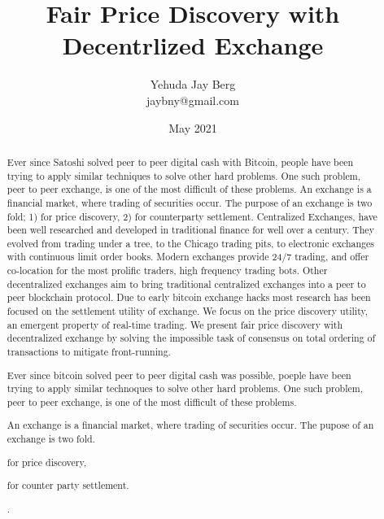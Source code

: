 \documentclass[12pt]{article}
\title{Fair Price Discovery with Decentrlized Exchange}
\author{Yehuda Jay Berg \\jaybny@gmail.com}
\date{May 2021}
\begin{document}
\parindent 0cm
\parskip   6pt
\maketitle




\begin{abstract}
    Ever  since  Satoshi  solved  peer  to  peer  digital  cash  with  Bitcoin,  people have  been  trying  to  apply  similar  techniques  to  solve  other  hard  problems. One such problem, peer to peer exchange, is one of the most difficult of these problems. An exchange is a financial market, where trading of securities occur. The purpose of an exchange is two fold;  1) for price discovery, 2) for counterparty settlement. Centralized Exchanges, have been well researched and developed in traditional finance for well over a century.  They evolved from trading under a tree, to the Chicago trading pits, to electronic exchanges with continuous limit order books. Modern exchanges provide 24/7 trading, and offer co-location for the most prolific traders, high frequency trading bots. Other decentralized exchanges aim to bring traditional centralized exchanges into a peer to peer blockchain protocol. Due to early bitcoin exchange hacks most research has been focused on the settlement utility of exchange. We focus on the price discovery utility, an emergent property of real-time trading. We present fair price discovery with decentralized exchange by solving the impossible task of consensus on total ordering of transactions to mitigate front-running.



    Ever since bitcoin solved peer to peer digital cash was possible, poeple have been trying to apply similar technoques to solve other hard problems. One such problem, peer to peer exchange, is one of the most difficult of these problems. 

An exchange is a financial market, where trading of securities occur. The pupose of an exchange is two fold. \begin {enumerate*} [1) ]%
\item for price discovery, \item for counter party settlement. \end {enumerate*}. 


\end{abstract}
\end{document}
